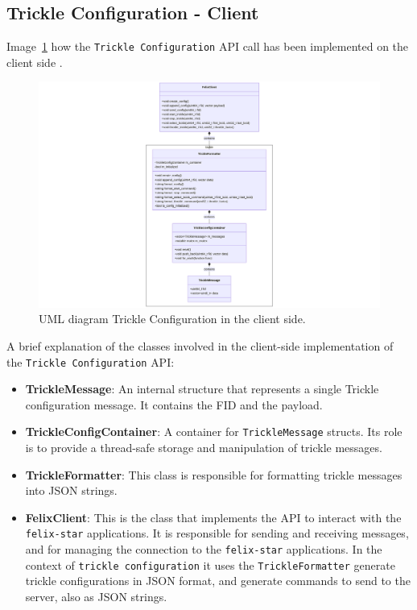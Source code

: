 \subsection{Trickle Configuration - Client}

Image~\ref{fig:trickle-client-uml} how the \texttt{Trickle Configuration} \acs{API} call has been implemented on the client side \cite{felix-star-trickle-client}. 

\begin{figure}[htbp]
\centering
\includegraphics[width=\textwidth]{images/contributions/client-trickle-config-uml.png}
\caption{UML diagram Trickle Configuration in the client side.}
\label{fig:trickle-client-uml}
\end{figure}

A brief explanation of the classes involved in the client-side implementation of the \texttt{Trickle Configuration} \acs{API}:

\begin{itemize}
    \item \textbf{TrickleMessage}: An internal structure that represents a single Trickle configuration message. It contains the \acs{FID} and the payload.
    
    \item \textbf{TrickleConfigContainer}: A container for \texttt{TrickleMessage} structs. Its role is to provide a thread-safe storage and manipulation of trickle messages.
    
    \item \textbf{TrickleFormatter}: This class is responsible for formatting trickle messages into JSON strings.
    
    \item \textbf{FelixClient}: This is the class that implements the \acs{API} to interact with the \texttt{felix-star} applications. It is responsible for sending and receiving messages, and for managing the connection to the \texttt{felix-star} applications. In the context of \texttt{trickle configuration} it uses the \texttt{TrickleFormatter} generate trickle configurations in JSON format, and generate commands to send to the server, also as JSON strings.
\end{itemize}

